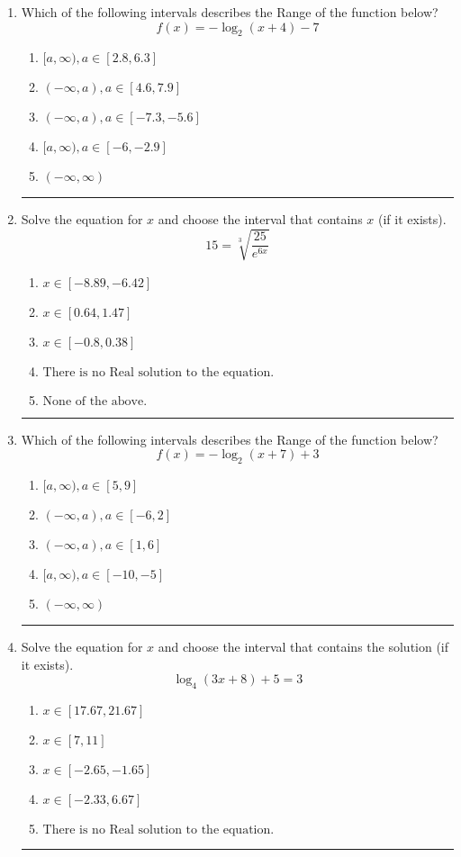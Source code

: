 \documentclass[14pt]{extbook}
\newcommand{\litem}[1]{\item#1\hspace*{-1cm}\rule{\textwidth}{0.4pt}}
\begin{document}
\begin{enumerate}
{\begin{enumerate}[label=\Alph*.]
\end{enumerate} }
\litem{
Which of the following intervals describes the Range of the function below?\[ f(x) = -\log_2{(x+4)}-7 \]\begin{enumerate}[label=\Alph*.]
\item \( [a, \infty), a \in [2.8, 6.3] \)
\item \( (-\infty, a), a \in [4.6, 7.9] \)
\item \( (-\infty, a), a \in [-7.3, -5.6] \)
\item \( [a, \infty), a \in [-6, -2.9] \)
\item \( (-\infty, \infty) \)

\end{enumerate} }
\litem{
 Solve the equation for $x$ and choose the interval that contains $x$ (if it exists).\[  15 = \sqrt[3]{\frac{25}{e^{6x}}} \]\begin{enumerate}[label=\Alph*.]
\item \( x \in [-8.89, -6.42] \)
\item \( x \in [0.64, 1.47] \)
\item \( x \in [-0.8, 0.38] \)
\item \( \text{There is no Real solution to the equation.} \)
\item \( \text{None of the above.} \)

\end{enumerate} }
\litem{
Which of the following intervals describes the Range of the function below?\[ f(x) = -\log_2{(x+7)}+3 \]\begin{enumerate}[label=\Alph*.]
\item \( [a, \infty), a \in [5, 9] \)
\item \( (-\infty, a), a \in [-6, 2] \)
\item \( (-\infty, a), a \in [1, 6] \)
\item \( [a, \infty), a \in [-10, -5] \)
\item \( (-\infty, \infty) \)

\end{enumerate} }
\litem{
Solve the equation for $x$ and choose the interval that contains the solution (if it exists).\[ \log_{4}{(3x+8)}+5 = 3 \]\begin{enumerate}[label=\Alph*.]
\item \( x \in [17.67, 21.67] \)
\item \( x \in [7, 11] \)
\item \( x \in [-2.65, -1.65] \)
\item \( x \in [-2.33, 6.67] \)
\item \( \text{There is no Real solution to the equation.} \)


\end{enumerate}}
\end{enumerate}
\end{document}
